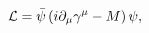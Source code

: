 \begin{equation}
\label{lagrangian}
{\cal L} = \bar{\psi}\left(i\partial_{\mu}\gamma^{\mu}-M \right)\psi,
\end{equation}

